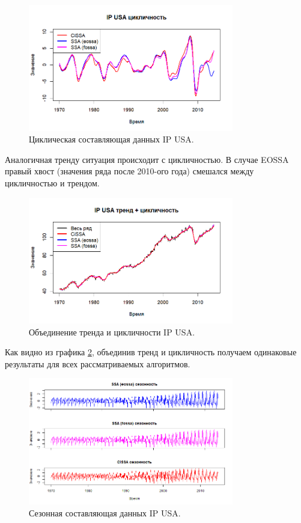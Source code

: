 \documentclass[12pt, specialist, subf
]{disser}
\theoremstyle{definition}
\begin{document}
\begin{figure}[H]
	\centering
	\includegraphics[width=0.8\textwidth]{img/trend inseparability example/IP_cycle.png}
	\caption{Циклическая составляющая данных IP USA.}
	\label{fig:IP_cycle}
\end{figure}

Аналогичная тренду ситуация происходит с цикличностью. В случае EOSSA правый хвост (значения ряда после 2010-ого года) смешался между цикличностью и трендом.

\begin{figure}[H]
	\centering
	\includegraphics[width=0.8\textwidth]{img/trend inseparability example/IP_trend_sycle.png}
	\caption{Объединение тренда и цикличности IP USA.}
	\label{fig:IP_trend_sycle}
\end{figure}

Как видно из графика \ref{fig:IP_trend_sycle}, объединив тренд и цикличность получаем одинаковые результаты для всех рассматриваемых алгоритмов.

\begin{figure}[H]
	\centering
	\includegraphics[width=0.8\textwidth]{img/trend inseparability example/IP_sesonal.jpg}
	\caption{Сезонная составляющая данных IP USA.}
	\label{fig:IP_sesonal}
\end{figure}
\end{document}
